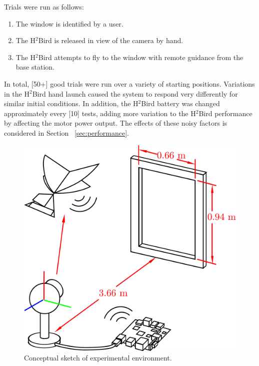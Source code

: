 \documentclass{aamas2013}
\begin{document}
Trials were run as follows:
\begin{enumerate}
\item The window is identified by a user. 
\item The H$^2$Bird is released in view of the camera by hand.
\item The H$^2$Bird attempts to fly to the window with remote guidance from
the base station.
\end{enumerate}

In total, [50+] good trials were run over a variety of starting positions. 
Variations in the H$^2$Bird hand launch caused the system to respond very 
differently for similar initial conditions. In addition, the H$^2$Bird 
battery was changed approximately every [10] tests, adding more variation to
the H$^2$Bird performance by affecting the motor power output. The effects of 
these noisy factors is considered in Section ~\ref{sec:performance}.

\begin{figure}[tb]
\centering
\includegraphics[width=\linewidth]{figures/experiment_cartoon.pdf}
\caption{Conceptual sketch of experimental environment.}
\label{fig:experiment_cartoon}
\end{figure}

\end{document}
